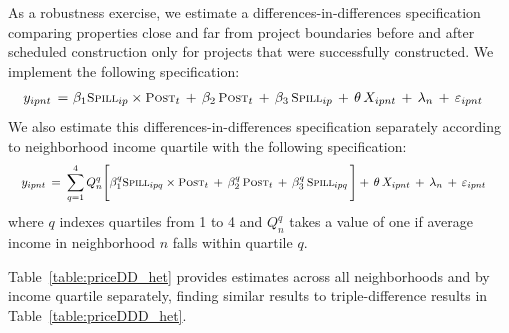 \documentclass[12pt]{article}
\begin{document}
As a robustness exercise, we estimate a differences-in-differences specification comparing properties close and far from project boundaries before and after scheduled construction only for projects that were successfully constructed.  We implement the following specification:
\begin{align}\label{eq:mainpricedd}
\begin{split}
\quad y_{ipnt} \, =& \,\,   \beta_1 \textsc{\small Spill}_{ip}\times\textsc{\small Post}_{t} \, + \, \beta_2 \, \textsc{\small Post}_{t} \, + \, \beta_3 \, \textsc{\small Spill}_{ip} \, + \, \theta \, X_{ipnt} \, + \, \lambda_n \, + \, \varepsilon_{ipnt} \quad 
\end{split}
\end{align}
We also estimate this differences-in-differences specification separately according to neighborhood income quartile with the following specification:
\begin{align}\label{eq:mainpricehetdd}
\begin{split}
\quad y_{ipnt} \, =& \,\, \sum_{q=1}^{4} Q_{n}^{q} \Bigg[ \beta_1^{q} \textsc{\small Spill}_{ipq}\times\textsc{\small Post}_{t} \, + \, \beta_2^{q} \, \textsc{\small Post}_{t} \, + \, \beta_3^{q} \, \textsc{\small Spill}_{ipq} \, \Bigg] + \, \theta \, X_{ipnt} \, + \, \lambda_n \, + \, \varepsilon_{ipnt} \quad 
\end{split}
\end{align}
\noindent where $q$ indexes quartiles from 1 to 4 and $Q_{n}^{q}$ takes a value of one if average income in neighborhood $n$ falls within quartile $q$.

Table~\ref{table:priceDD_het} provides estimates across all neighborhoods and by income quartile separately, finding similar results to triple-difference results in Table~\ref{table:priceDDD_het}.
\end{document}
